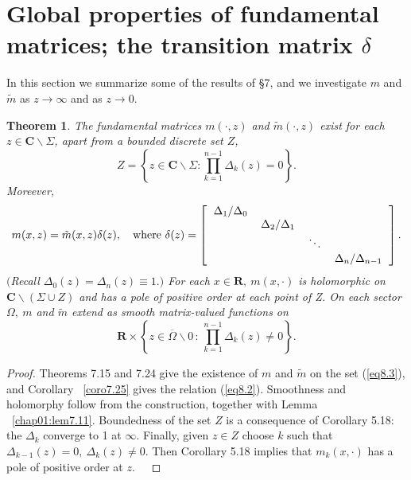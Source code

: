 \documentclass{surv-l}
\theoremstyle{plain}
\newtheorem{theorem}{Theorem}[section]
\theoremstyle{definition}
\numberwithin{equation}{chapter}
\begin{document}
\section{Global properties of fundamental matrices; the transition matrix $\delta$}\label{sec8}
In this section we summarize some of the results of \S7, and we investigate $m$ and $\tilde{m}$ as $ z\rightarrow\infty$ and as $z \rightarrow 0$.
\setcounter{theorem}{0}
\begin{theorem}\label{thm8.1}
The fundamental matrices $m(\cdot, z)$ and $\tilde{m}(\cdot,z)$ exist for each $ z\in \mathbf{C}\backslash \Sigma$, apart from a bounded discrete set $Z$,
\begin{equation*}
Z=\left\{z\in \mathbf{C}\backslash \Sigma:\prod_{k=1}^{n-1}\Delta_{k}(z)=0\right\}.
\end{equation*}
Moreever,
\setcounter{equation}{1}
\begin{equation}\label{eq8.2}
m(x, z)=\tilde{m}(x, z)\delta(z),\quad \text{where } \delta(z)=\left[\begin{tabular}{cccc}
$\Delta_{1}/\Delta_{0}$ &                            &           &\\
                               & $\Delta_{2}/\Delta_{1}$ &           &\\
                               &                            & $\ddots$  &\\
                               &                            &           & $\Delta_{n}/\Delta_{n-1}$
\end{tabular}\right].
\end{equation}
$($Recall $\Delta_{0}(z)=\Delta_{n}(z)\equiv 1.)$ For each $x\in \mathbf{R},\ m(x, \cdot)$ is holomorphic on $\mathbf{C}\backslash (\Sigma\cup Z)$ and has a pole of positive order at each point of Z.  On each sector $\Omega,\ m$ and $\tilde{m}$ extend as smooth matrix-valued functions on
\begin{equation}\label{eq8.3}
\mathbf{R}\times\left\{z\in\overline{\Omega}\backslash 0\, :\, \prod_{k=1}^{n-1}\Delta_{k}(z)\neq 0\right\}.
\end{equation}
\end{theorem}
\begin{proof}
Theorems 7.15 and 7.24 give the existence of $m$ and $\tilde{m}$ on the set (\ref{eq8.3}), and Corollary ~\ref{coro7.25} gives the relation (\ref{eq8.2}). Smoothness and holomorphy follow from the construction, together with Lemma ~\ref{chap01:lem7.11}. Boundedness of the set $Z$ is a consequence of Corollary 5.18: the $\Delta_{k}$ converge to 1 at $\infty$. Finally, given $z\in Z$ choose $k$ such that $\Delta_{k-1}(z)=0,\ \Delta_{k}(z)\neq 0$. Then Corollary 5.18 implies that $m_{k}(x, \cdot)$ has a pole of positive order at $z.\quad$
\end{proof}
\end{document}
